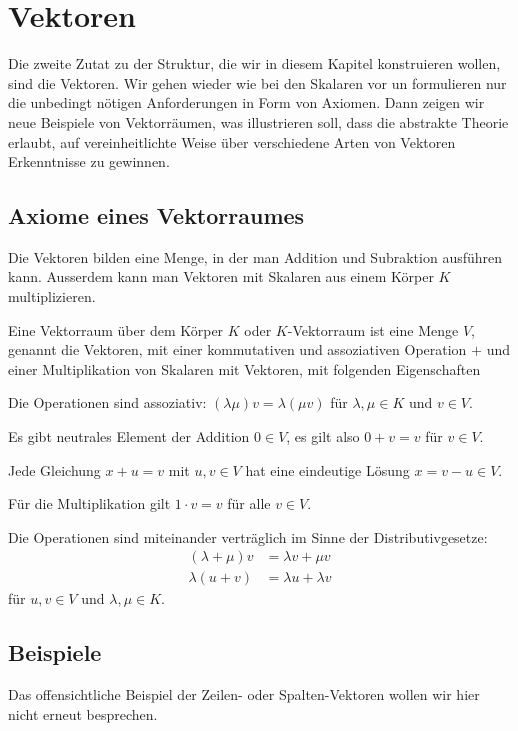 %
%
%
\section{Vektoren}
Die zweite Zutat zu der Struktur, die wir in diesem Kapitel
konstruieren wollen, sind die Vektoren.
Wir gehen wieder wie bei den Skalaren vor un formulieren nur
die unbedingt nötigen Anforderungen in Form von Axiomen.
Dann zeigen wir neue Beispiele von Vektorräumen, was illustrieren soll,
dass die abstrakte Theorie erlaubt, auf vereinheitlichte Weise über
verschiedene Arten von Vektoren Erkenntnisse zu gewinnen.

\subsection{Axiome eines Vektorraumes}
Die Vektoren bilden eine Menge, in der man Addition und Subraktion 
ausführen kann.
Ausserdem kann man Vektoren mit Skalaren aus einem Körper $K$ multiplizieren.

\begin{definition}
Eine Vektorraum über dem Körper $K$ oder $K$-Vektorraum
ist eine Menge $V$, genannt die Vektoren,
mit einer kommutativen und assoziativen Operation $+$ und einer Multiplikation
von Skalaren mit Vektoren, mit folgenden Eigenschaften
\begin{compactenum}
\item Die Operationen sind assoziativ: $(\lambda\mu)v=\lambda(\mu v)$ für
$\lambda,\mu\in K$ und $v\in V$.
\item Es gibt neutrales Element der Addition $0\in V$, es gilt also
$0+v=v$ für $v\in V$.
\item Jede Gleichung $x+u=v$ mit $u,v\in V$ hat eine eindeutige Lösung
$x=v-u\in V$.
\item Für die Multiplikation gilt $1\cdot v=v$ für alle $v\in V$.
\item Die Operationen sind miteinander verträglich im Sinne der 
Distributivgesetze:
\begin{align*}
(\lambda + \mu)v&=\lambda v + \mu v
\\
\lambda(u+v)&=\lambda u + \lambda v
\end{align*}
für $u,v\in V$ und $\lambda,\mu\in K$.
\end{compactenum}
\end{definition}

\subsection{Beispiele}
Das offensichtliche Beispiel der Zeilen- oder Spalten-Vektoren wollen wir
hier nicht erneut besprechen.

